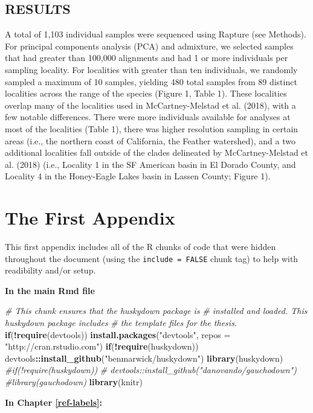 \documentclass[twoside,12pt,final]{ucthesis-CA2012} %
\newenvironment{Shaded}{}{}
\newcommand{\KeywordTok}[1]{\textcolor[rgb]{0.00,0.44,0.13}{\textbf{{#1}}}}
\newcommand{\DataTypeTok}[1]{\textcolor[rgb]{0.56,0.13,0.00}{{#1}}}
\newcommand{\StringTok}[1]{\textcolor[rgb]{0.25,0.44,0.63}{{#1}}}
\newcommand{\CommentTok}[1]{\textcolor[rgb]{0.38,0.63,0.69}{\textit{{#1}}}}
\newcommand{\NormalTok}[1]{{#1}}
\newcommand{\OperatorTok}[1]{\textcolor[rgb]{0.00,0.44,0.13}{\textbf{{#1}}}}
\newcommand{\ControlFlowTok}[1]{\textcolor[rgb]{0.00,0.44,0.13}{\textbf{{#1}}}}
\begin{document}
\begin{ucmainmatter}
\hypertarget{results-2}{%
\section{RESULTS}\label{results-2}}

A total of 1,103 individual samples were sequenced using Rapture (see
Methods). For principal components analysis (PCA) and admixture, we
selected samples that had greater than 100,000 alignments and had 1 or
more individuals per sampling locality. For localities with greater than
ten individuals, we randomly sampled a maximum of 10 samples, yielding
480 total samples from 89 distinct localities across the range of the
species (Figure 1, Table 1). These localities overlap many of the
localities used in McCartney-Melstad et al. (2018), with a few notable
differences. There were more individuals available for analyses at most
of the localities (Table 1), there was higher resolution sampling in
certain areas (i.e., the northern coast of California, the Feather
watershed), and a two additional localities fall outside of the clades
delineated by McCartney-Melstad et al. (2018) (i.e., Locality 1 in the
SF American basin in El Dorado County, and Locality 4 in the Honey-Eagle
Lakes basin in Lassen County; Figure 1).

\appendix

\hypertarget{the-first-appendix}{%
\chapter{The First Appendix}\label{the-first-appendix}}

This first appendix includes all of the R chunks of code that were
hidden throughout the document (using the \texttt{include\ =\ FALSE}
chunk tag) to help with readibility and/or setup.

\textbf{In the main Rmd file}
\begin{Shaded}
\begin{Highlighting}[]
\CommentTok{# This chunk ensures that the huskydown package is}
\CommentTok{# installed and loaded. This huskydown package includes}
\CommentTok{# the template files for the thesis.}
\ControlFlowTok{if}\NormalTok{(}\OperatorTok{!}\KeywordTok{require}\NormalTok{(devtools))}
  \KeywordTok{install.packages}\NormalTok{(}\StringTok{"devtools"}\NormalTok{, }\DataTypeTok{repos =} \StringTok{"http://cran.rstudio.com"}\NormalTok{)}
\ControlFlowTok{if}\NormalTok{(}\OperatorTok{!}\KeywordTok{require}\NormalTok{(huskydown))}
\NormalTok{  devtools}\OperatorTok{::}\KeywordTok{install_github}\NormalTok{(}\StringTok{"benmarwick/huskydown"}\NormalTok{)}
\KeywordTok{library}\NormalTok{(huskydown)}
\CommentTok{#if(!require(huskydown))}
\CommentTok{#  devtools::install_github("danovando/gauchodown")}
\CommentTok{#library(gauchodown)}
\KeywordTok{library}\NormalTok{(knitr)}
\end{Highlighting}
\end{Shaded}
\textbf{In Chapter \ref{ref-labels}:}


\end{ucmainmatter}
\end{document}
